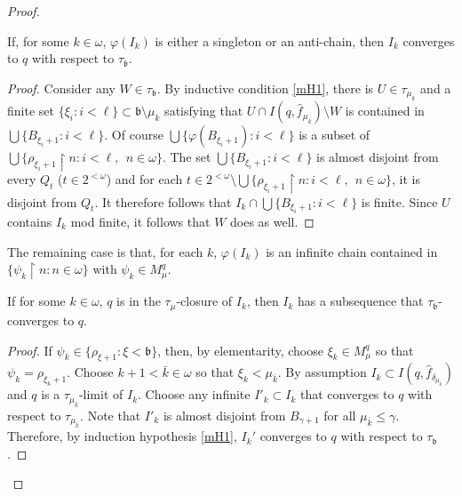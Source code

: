 \documentclass[10pt,a4paper]{amsart}
\begin{document}
\begin{proof}
 \begin{claim} If, for some $k\in\omega$, $\varphi(I_k)$ is either a singleton
  or an anti-chain, then $I_k$ converges to $q$ with respect to $\tau_{\mathfrak b}$. 
 \end{claim}


 \begin{proof}  
 Consider any $W\in \tau_{\mathfrak b}$.  By inductive condition \ref{mH1},
  there is   $U\in \tau_{\mu_k}$ and a finite set $\{\xi_i : i<\ell\}\subset
     \mathfrak b \setminus \mu_k$ satisfying that
       $U\cap I(q,\hat f_{\mu_k}) \setminus W$ is contained in
         $\bigcup\{ B_{\xi_i+1} : i< \ell\}$.  
Of course $\bigcup\{ \varphi(B_{\xi_i+1}) : i<\ell\}$ is a subset of
   $\bigcup \{ \rho_{\xi_i+1}\restriction n : i< \ell,\ \ n\in\omega\}$. 
The set $\bigcup\{ B_{\xi_i+1} : i< \ell\}$ is almost disjoint
from every $Q_t$ ($t\in 2^{<\omega}$) and for each
 $t\in 2^{<\omega}\setminus 
  \bigcup \{ \rho_{\xi_i+1}\restriction n : i< \ell,\ \ n\in\omega\}$,
  it 
      is disjoint from
      $Q_t$.   
      It therefore follows that $I_k\cap 
        \bigcup\{ B_{\xi_i+1} : i< \ell\} $ is finite. 
        Since $U$ contains $I_k$ mod finite, it follows
        that $W$ does as well.
 \end{proof}

 The remaining case is that, for each $k$, $\varphi(I_k)$
 is an infinite chain contained in $\{ \psi_k\restriction n : n\in \omega\}$
 with $\psi_k\in M^q_\mu$.  
 
 \begin{claim} If for some $k\in\omega$, $q$  is in the $\tau_{\mu}$-closure
 of $I_k$, then $I_k$ has a subsequence that $\tau_{\mathfrak b}$-converges to $q$.
 \end{claim}

 \begin{proof}  If $\psi_k\in \{ \rho_{\xi+1} : \xi <\mathfrak b\}$, then,
  by elementarity, 
 choose $\xi_k\in M^q_\mu$ so that $\psi_k = \rho_{\xi_k+1}$.  Choose 
  $ k +1 < \bar k\in \omega$ so that $\xi_k < \mu_{\bar k}$. 
  By assumption $I_k \subset I(q, \hat f_{\delta_{\mu_{\bar k}}})$ and
     $q$ is a $\tau_{\mu_{\bar k}}$-limit of $I_k$. Choose any infinite
      $I'_k\subset I_k$ that converges to $q$ with respect to 
      $\tau_{\mu_{\bar k}}$. Note that $I'_k$ is almost disjoint
      from $B_{\gamma+1}$ for all $\mu_{\bar k}\leq \gamma$. 
      Therefore, by induction hypothesis \ref{mH1}, $I_k'$ 
      converges to $q$ with respect to $\tau_{\mathfrak b}$. 
 \end{proof}



\end{proof}
\end{document}
